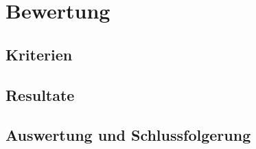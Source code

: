 
\section{Bewertung}
\label{Bewertung}


\subsection{Kriterien}
\label{Bewertung:Kriterien}


\subsection{Resultate}
\label{Bewertung:Resultate}


\subsection{Auswertung und Schlussfolgerung}
\label{Bewertung:Auswertung und Schlussfolgerung}

